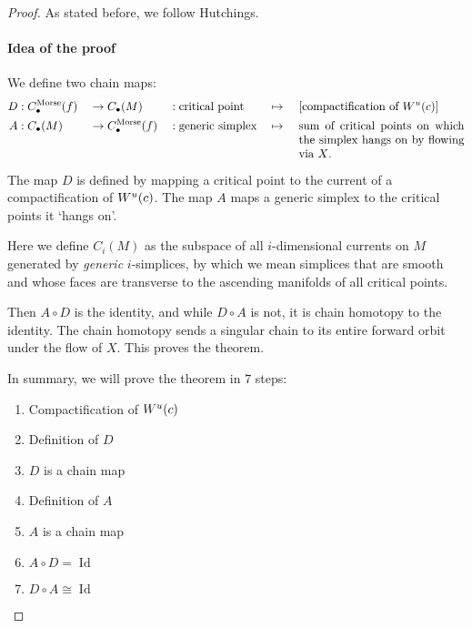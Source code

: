 \begin{proof}
    As stated before, we follow Hutchings.
    \paragraph{Idea of the proof}
    
    We define two chain maps:
    \begin{alignat*}{5}
        D&: C_\bul^{\text{Morse}}(f) &&\to  C_\bul(M)&&: \text{critical point} &&\mapsto &&\ [\text{compactification of $\unstable{c}$}]\\
        A&: C_\bul(M) &&\to  C_\bul^{\text{Morse}}(f)&&: \text{generic simplex} &&\mapsto &&\ \parbox[t][][t]{5cm}{sum of critical points on which the simplex hangs on by flowing via $X$.}
    \end{alignat*}
\begin{marginfigure}
    \centering
    \caption{The map $D$ is defined by mapping a critical point to the current of a compactification of $W^u(c)$. The map $A$ maps a generic simplex to the critical points it `hangs on'.}
    \label{fig:idea-of-the-proof-maps-a-and-d}
\end{marginfigure}

    Here we define $C_i(M)$ as the subspace of all  $i$-dimensional currents on $M$ generated by \emph{generic} $i$-simplices, by which we mean simplices that are smooth and whose faces are transverse to the ascending manifolds of all critical points.


    Then $A  \circ D$ is the identity, and while $D  \circ  A$ is not, it is chain homotopy to the identity.
    The chain homotopy sends a singular chain to its entire forward orbit under the flow of $X$.
    This proves the theorem.

    In summary, we will prove the theorem in $7$ steps:
    \begin{enumerate}
        \item Compactification of $W^u(c)$
        \item Definition of $D$
        \item $D$ is a chain map
        \item Definition of $A$
        \item $A$ is a chain map
        \item $A  \circ D = \operatorname{Id}$
        \item  $D  \circ A \cong \operatorname{Id}$
    \end{enumerate}


\end{proof}
